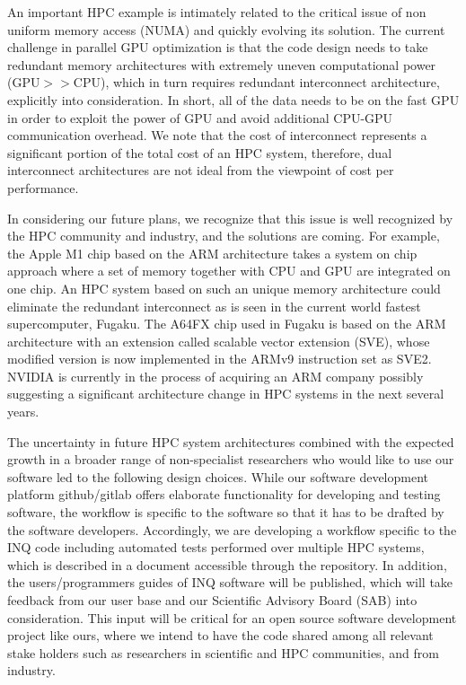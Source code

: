 An important HPC example is intimately related to the critical issue of non uniform memory access (NUMA) and quickly evolving its solution. The current challenge in parallel GPU optimization is that the code design needs to take redundant memory architectures with extremely uneven computational power (GPU$>>$CPU), which in turn requires redundant interconnect architecture, explicitly into consideration. In short, all of the data needs to be on the fast GPU in order to exploit the power of GPU and avoid additional CPU-GPU communication overhead. We note that the cost of interconnect represents a significant portion of the total cost of an HPC system, therefore, dual interconnect architectures are not ideal from the viewpoint of cost per performance. 

In considering our future plans, we recognize that this issue is well recognized by the HPC community and industry, and the solutions are coming. For example, the Apple M1 chip based on the ARM architecture takes a system on chip approach where a set of memory together with CPU and GPU are integrated on one chip. An HPC system based on such an unique memory architecture could eliminate the redundant interconnect as is seen in the current world fastest supercomputer, Fugaku. The A64FX chip used in Fugaku is based on the ARM architecture with an extension called scalable vector extension (SVE), whose modified version is now implemented in the ARMv9 instruction set as SVE2. NVIDIA is currently in the process of acquiring an ARM company possibly suggesting a significant architecture change in HPC systems in the next several years.

 The uncertainty in future HPC system architectures combined with the expected growth in a broader range of non-specialist researchers who would like to use our software led to the following design choices. While our software development platform github/gitlab offers elaborate functionality for developing and testing software, the workflow is specific to the software so that it has to be drafted by the software developers. Accordingly, we are developing a workflow specific to the INQ code including automated tests performed over multiple HPC systems, which is described in a document accessible through the repository. In addition, the users/programmers guides of INQ software will be published, which will take feedback from our user base and our Scientific Advisory Board (SAB) into consideration. This input will be critical for an open source software development project like ours, where we intend to have the code shared among all relevant stake holders such as researchers in scientific and HPC communities, and from industry.
 
